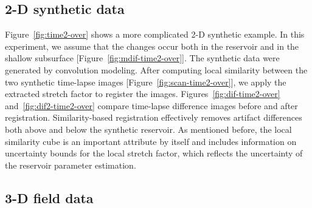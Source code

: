 \subsection{2-D synthetic data} 
 


Figure~\ref{fig:time2-over} shows a more complicated 2-D synthetic
example. In this experiment, we assume that the changes occur both in
the reservoir and in the shallow subsurface
[Figure~\ref{fig:mdif-time2-over}]. The synthetic data were generated
by convolution modeling. After computing local similarity between the
two synthetic time-lapse images [Figure~\ref{fig:scan-time2-over}], we
apply the extracted stretch factor to register the images.
Figures~\ref{fig:dif-time2-over} and~\ref{fig:dif2-time2-over} compare
time-lapse difference images before and after
registration. Similarity-based registration effectively removes
artifact differences both above and below the synthetic reservoir. As
mentioned before, the local similarity cube is an important attribute
by itself and includes information on uncertainty bounds for the local
stretch factor, which reflects the uncertainty of the reservoir
parameter estimation.

\subsection{3-D field data}


